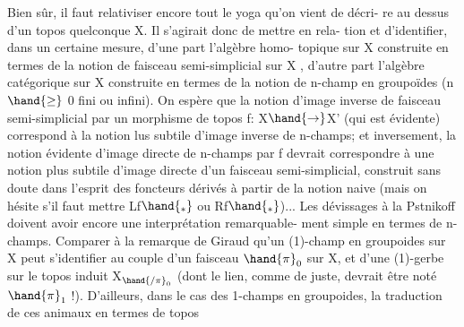  Bien sûr, il faut relativiser encore tout le yoga qu'on vient de décri-%
re\hand{,} au dessus d'un topos quelconque X. Il s'agirait donc de mettre en rela-%
tion et d'identifier, dans un certaine mesure, d'une part l'algèbre homo-%
topique sur X construite en termes de la notion de faisceau semi-simplicial
sur X , d'autre part l'algèbre catégorique sur X construite en termes de
la notion de n-champ en groupoïdes (n $\hand{\geq}$ 0 fini ou infini). On espère que
la notion d'image inverse de faisceau semi-simplicial par un morphisme de
topos f: X$\hand{\to}$X' (qui est évidente)  correspond à la notion lus
subtile d'image inverse de n-champs; et inversement,  la notion évidente
d'image directe de n-champs par f devrait correspondre à une notion plus
subtile d'image directe d'un faisceau semi-simplicial, construit sans doute
dans l'esprit des foncteurs dérivés à partir de la notion naive (mais on
hésite s'il faut mettre Lf$\hand{_*}$ ou Rf$\hand{_*}$)... Les dévissages à la Pstnikoff
 doivent avoir encore une interprétation remarquable-%
ment simple en termes de n-champs. Comparer à la remarque de Giraud qu'un
(1)-champ en groupoides sur X peut s'identifier au couple d'un faisceau
$\hand{\pi}_0$ sur X, et d'une (1)-gerbe sur le topos induit X$_{\hand{/\pi}_0}$ (dont le lien,
comme de juste, devrait être noté $\hand{\pi}_1$ !). D'ailleurs, dans le cas des
1-champs en groupoides, la traduction de ces animaux en termes de topos

